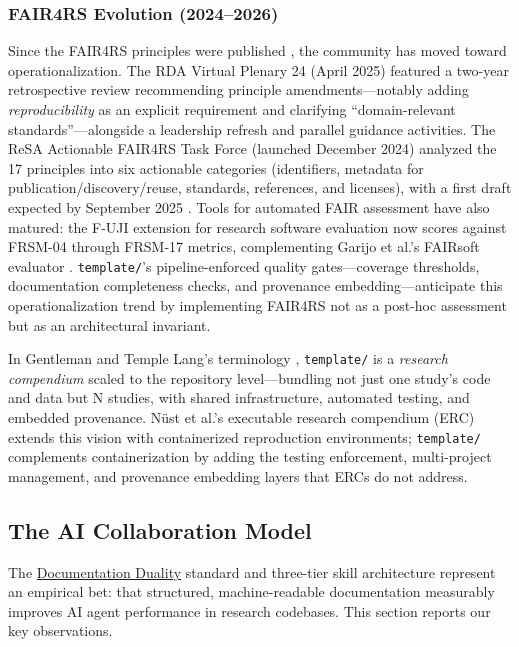 \documentclass[
  english,
]{article}
\begin{document}
\subsubsection{FAIR4RS Evolution
(2024--2026)}\label{fair4rs-evolution-20242026}

Since the FAIR4RS principles were published \citep{barker2022fair4rs},
the community has moved toward operationalization. The RDA Virtual
Plenary 24 (April 2025) featured a two-year retrospective review
\citep{honeyman2024fair4rs} recommending principle amendments---notably
adding \emph{reproducibility} as an explicit requirement and clarifying
``domain-relevant standards''---alongside a leadership refresh and
parallel guidance activities. The ReSA Actionable FAIR4RS Task Force
(launched December 2024) analyzed the 17 principles into six actionable
categories (identifiers, metadata for publication/discovery/reuse,
standards, references, and licenses), with a first draft expected by
September 2025 \citep{resa2024actionable}. Tools for automated FAIR
assessment have also matured: the F-UJI extension for research software
evaluation now scores against FRSM-04 through FRSM-17 metrics,
complementing Garijo et al.'s FAIRsoft evaluator
\citep{garijo2024fairsoft}. \texttt{template/}'s pipeline-enforced
quality gates---coverage thresholds, documentation completeness checks,
and provenance embedding---anticipate this operationalization trend by
implementing FAIR4RS not as a post-hoc assessment but as an
architectural invariant.

In Gentleman and Temple Lang's terminology
\citep{gentleman2007research}, \texttt{template/} is a \emph{research
compendium} scaled to the repository level---bundling not just one
study's code and data but N studies, with shared infrastructure,
automated testing, and embedded provenance. Nüst et al.'s executable
research compendium (ERC) \citep{nust2017containerization} extends this
vision with containerized reproduction environments; \texttt{template/}
complements containerization by adding the testing enforcement,
multi-project management, and provenance embedding layers that ERCs do
not address.

\newpage

\subsection{The AI Collaboration
Model}\label{the-ai-collaboration-model}

The
\href{03c_documentation.md\#documentation-duality-and-ai-collaboration}{Documentation
Duality} standard and three-tier skill architecture represent an
empirical bet: that structured, machine-readable documentation
measurably improves AI agent performance in research codebases. This
section reports our key observations.
\end{document}
